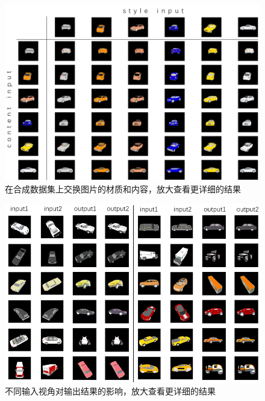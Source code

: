 \documentclass[UTF8,openany,AutoFakeBold,AutoFakeSlant,cs4size]{ctexbook}
\begin{document}
\begin{figure}
\centering
\includegraphics[width=\linewidth]{./images/appendix_syn_swap.png}
\caption{在合成数据集上交换图片的材质和内容，放大查看更详细的结果}
\label{appendix_syn_swap}
\end{figure}

\begin{figure}
\centering
\includegraphics[width=\linewidth]{./images/appendix_style_consistency.png}
\caption{不同输入视角对输出结果的影响，放大查看更详细的结果}
\label{appendix_style_consistency}
\end{figure}




{
	\fancyhf{}
	\fancyfoot[CO,CE]{~\thepage~}
	\renewcommand{\headrulewidth}{0.7pt}
	\renewcommand{\footrulewidth}{0pt}
}
\fancyhf{}
\fancyfoot[CO,CE]{~\thepage~}
\renewcommand{\headrulewidth}{0.7pt}
\renewcommand{\footrulewidth}{0pt}
\end{document}
